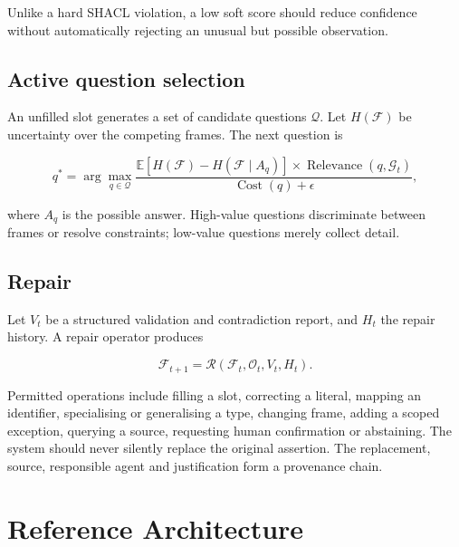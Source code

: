 \documentclass[11pt,a4paper]{article}
\newcommand{\Frame}{\mathcal{F}}
\newcommand{\Obs}{\mathcal{O}}
\newcommand{\Goals}{\mathcal{G}}
\newcommand{\Repair}{\mathcal{R}}
\newcommand{\Cost}{\operatorname{Cost}}
\begin{document}
Unlike a hard SHACL violation, a low soft score should reduce confidence without
automatically rejecting an unusual but possible observation.

\subsection{Active question selection}

An unfilled slot generates a set of candidate questions $\mathcal{Q}$. Let
$H(\Frame)$ be uncertainty over the competing frames. The next question is

\begin{equation}
q^*=\arg\max_{q\in\mathcal{Q}}
\frac{\mathbb{E}\left[H(\Frame)-H(\Frame\mid A_q)\right]
\times \operatorname{Relevance}(q,\Goals_t)}
{\Cost(q)+\epsilon},
\label{eq:question}
\end{equation}

where $A_q$ is the possible answer. High-value questions discriminate between
frames or resolve constraints; low-value questions merely collect detail.

\subsection{Repair}

Let $V_t$ be a structured validation and contradiction report, and $H_t$ the
repair history. A repair operator produces

\begin{equation}
\Frame_{t+1}=\Repair(\Frame_t,\Obs_t,V_t,H_t).
\label{eq:repair}
\end{equation}

Permitted operations include filling a slot, correcting a literal, mapping an
identifier, specialising or generalising a type, changing frame, adding a scoped
exception, querying a source, requesting human confirmation or abstaining. The
system should never silently replace the original assertion. The replacement,
source, responsible agent and justification form a provenance chain.

\section{Reference Architecture}
\end{document}
